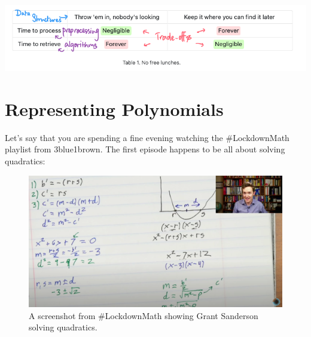 \documentclass[
  letterpaper,
  DIV=11,
  numbers=noendperiod]{scrreprt}
\begin{document}
\begin{tcolorbox}[standard jigsaw,toptitle=1mm, titlerule=0mm, bottomtitle=1mm, title=\textcolor{quarto-callout-note-color}{\faInfo}\hspace{0.5em}{This \emph{is} in fact a useful framing!}, coltitle=black, colback=white, toprule=.15mm, colframe=quarto-callout-note-color-frame, arc=.35mm, rightrule=.15mm, opacityback=0, left=2mm, leftrule=.75mm, colbacktitle=quarto-callout-note-color!10!white, opacitybacktitle=0.6, bottomrule=.15mm]
\includegraphics{./figures/ch1-table01.png}
\end{tcolorbox}

\hypertarget{representing-polynomials}{%
\section{Representing Polynomials}\label{representing-polynomials}}

Let's say that you are spending a fine evening watching the
\#LockdownMath playlist from 3blue1brown. The first episode happens to
be all about solving quadratics:

\begin{figure}

{\centering \includegraphics{./figures/ch1-lockdownmath.png}

}

\caption{A screenshot from \#LockdownMath showing Grant Sanderson
solving quadratics.}

\end{figure}
\end{document}
